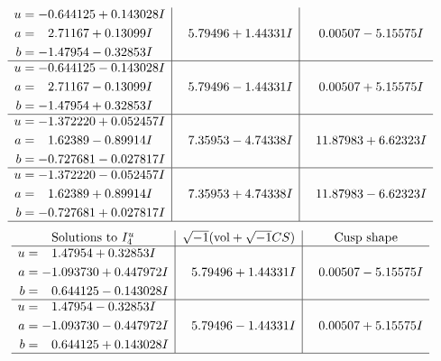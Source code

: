 \documentclass[1p]{elsarticle_modified}
\theoremstyle{definition}
\newcommand{\I}{\sqrt{-1}}
\begin{document}
$$\begin{array}{c|c|c}
\begin{aligned}
u &= -0.644125 + 0.143028 I \\
a &= \phantom{-}2.71167 + 0.13099 I \\
b &= -1.47954 - 0.32853 I\end{aligned}
 & \phantom{-}5.79496 + 1.44331 I & \phantom{-}0.00507 - 5.15575 I \\ \hline\begin{aligned}
u &= -0.644125 - 0.143028 I \\
a &= \phantom{-}2.71167 - 0.13099 I \\
b &= -1.47954 + 0.32853 I\end{aligned}
 & \phantom{-}5.79496 - 1.44331 I & \phantom{-}0.00507 + 5.15575 I \\ \hline\begin{aligned}
u &= -1.372220 + 0.052457 I \\
a &= \phantom{-}1.62389 - 0.89914 I \\
b &= -0.727681 - 0.027817 I\end{aligned}
 & \phantom{-}7.35953 - 4.74338 I & \phantom{-}11.87983 + 6.62323 I \\ \hline\begin{aligned}
u &= -1.372220 - 0.052457 I \\
a &= \phantom{-}1.62389 + 0.89914 I \\
b &= -0.727681 + 0.027817 I\end{aligned}
 & \phantom{-}7.35953 + 4.74338 I & \phantom{-}11.87983 - 6.62323 I\\
 \hline 
 \end{array}$$\newpage$$\begin{array}{c|c|c}  
\text{Solutions to }I^u_{4}& \I (\text{vol} + \sqrt{-1}CS) & \text{Cusp shape}\\
 \hline 
\begin{aligned}
u &= \phantom{-}1.47954 + 0.32853 I \\
a &= -1.093730 + 0.447972 I \\
b &= \phantom{-}0.644125 - 0.143028 I\end{aligned}
 & \phantom{-}5.79496 + 1.44331 I & \phantom{-}0.00507 - 5.15575 I \\ \hline\begin{aligned}
u &= \phantom{-}1.47954 - 0.32853 I \\
a &= -1.093730 - 0.447972 I \\
b &= \phantom{-}0.644125 + 0.143028 I\end{aligned}
 & \phantom{-}5.79496 - 1.44331 I & \phantom{-}0.00507 + 5.15575 I\\
 \hline 
 \end{array}$$\newpage
\end{document}
